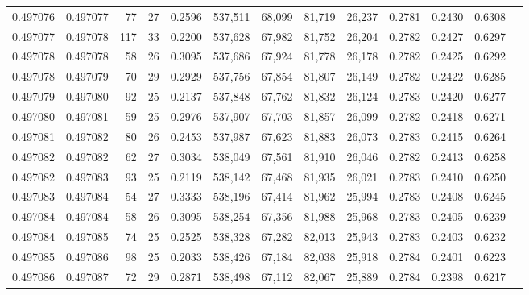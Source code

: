 \begin{tabular}{rrrrrrrrrrrrr}
0.497076 & 0.497077 &  77 &  27 &                                     0.2596 & 537,511 &  68,099 &  81,719 &  26,237 & 0.2781 & 0.2430 & 0.6308 \\
0.497077 & 0.497078 & 117 &  33 &                                     0.2200 & 537,628 &  67,982 &  81,752 &  26,204 & 0.2782 & 0.2427 & 0.6297 \\
0.497078 & 0.497078 &  58 &  26 &                                     0.3095 & 537,686 &  67,924 &  81,778 &  26,178 & 0.2782 & 0.2425 & 0.6292 \\
0.497078 & 0.497079 &  70 &  29 &                                     0.2929 & 537,756 &  67,854 &  81,807 &  26,149 & 0.2782 & 0.2422 & 0.6285 \\
0.497079 & 0.497080 &  92 &  25 &                                     0.2137 & 537,848 &  67,762 &  81,832 &  26,124 & 0.2783 & 0.2420 & 0.6277 \\
0.497080 & 0.497081 &  59 &  25 &                                     0.2976 & 537,907 &  67,703 &  81,857 &  26,099 & 0.2782 & 0.2418 & 0.6271 \\
0.497081 & 0.497082 &  80 &  26 &                                     0.2453 & 537,987 &  67,623 &  81,883 &  26,073 & 0.2783 & 0.2415 & 0.6264 \\
0.497082 & 0.497082 &  62 &  27 &                                     0.3034 & 538,049 &  67,561 &  81,910 &  26,046 & 0.2782 & 0.2413 & 0.6258 \\
0.497082 & 0.497083 &  93 &  25 &                                     0.2119 & 538,142 &  67,468 &  81,935 &  26,021 & 0.2783 & 0.2410 & 0.6250 \\
0.497083 & 0.497084 &  54 &  27 &                                     0.3333 & 538,196 &  67,414 &  81,962 &  25,994 & 0.2783 & 0.2408 & 0.6245 \\
0.497084 & 0.497084 &  58 &  26 &                                     0.3095 & 538,254 &  67,356 &  81,988 &  25,968 & 0.2783 & 0.2405 & 0.6239 \\
0.497084 & 0.497085 &  74 &  25 &                                     0.2525 & 538,328 &  67,282 &  82,013 &  25,943 & 0.2783 & 0.2403 & 0.6232 \\
0.497085 & 0.497086 &  98 &  25 &                                     0.2033 & 538,426 &  67,184 &  82,038 &  25,918 & 0.2784 & 0.2401 & 0.6223 \\
0.497086 & 0.497087 &  72 &  29 &                                     0.2871 & 538,498 &  67,112 &  82,067 &  25,889 & 0.2784 & 0.2398 & 0.6217 \\

\end{tabular}
